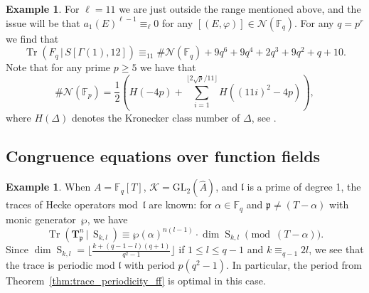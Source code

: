 \documentclass[10pt]{article}
\theoremstyle{definition}
\newtheorem{example}[theorem]{Example}
\let\phi\varphi
\DeclareMathOperator\Tr{Tr}
\renewcommand{\:}{\colon}
\newcommand{\T}{\mathbf{T}}
\renewcommand{\S}{\operatorname{S}}
\newcommand{\bF}{\mathbb{F}}
\renewcommand{\l}{\mathfrak{l}}
\begin{document}
\begin{example} For $\ell=11$ we are just outside the range mentioned above, and the issue will be that $a_1(E)^{\ell-1}\equiv_{\ell}0$ for any $[(E,\phi)] \in \mathcal N(\mathbb F_q)$.
    For any $q=p^r$ we find that 
    \[
    \Tr(F_q \, | \, S[\Gamma(1),12]) \equiv_{11} \# \mathcal N(\mathbb F_q)+9q^6+9q^4+2q^3+9q^2+q+10.
    \]
    Note that for any prime $p \geq 5$ we have that 
    \[
    \# \mathcal N(\mathbb F_p)=\frac{1}{2} \left(H(-4p)+\sum_{i=1}^{\lfloor 2\sqrt{p}/11\rfloor} H \left((11i)^2-4p \right)\right),
    \]
    where $H(\Delta)$ denotes the Kronecker class number of $\Delta$, see \cite[Theorem 4.6]{Schoof}. 
\end{example}

\subsection{Congruence equations over function fields}
\begin{example}
    When $A = \mathbb F_q[T]$, $\mathcal{K} = \mathrm{GL}_2(\hat{A})$, and $\l$ is a prime of degree 1, the traces of Hecke operators mod~$\l$ are known: for $\alpha \in \bF_q$ and $\mathfrak p \neq (T-\alpha)$ with monic generator~$\wp$, we have \cite[Cor.~3.3]{joshi-petrov}
    \[
    \Tr(\T_{\mathfrak p}^n \, | \, \S_{k,l}) \equiv \wp(\alpha)^{n(l-1)} \cdot \dim \S_{k,l} \pmod{(T-\alpha)}.
    \]
    Since $\dim \S_{k,l} = \lfloor \frac{k + (q-1-l)(q+1)}{q^2-1} \rfloor$ if $1 \leq l \leq q-1$ and $k \equiv_{q-1} 2l$, we see that the trace is periodic mod $\l$ with period $p(q^2-1)$. In particular, the period from Theorem~\ref{thm:trace_periodicity_ff} is optimal in this case.
\end{example}
\end{document}
